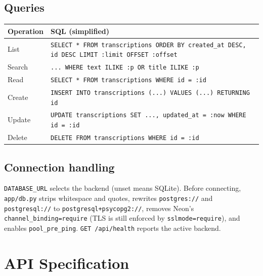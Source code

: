\documentclass[11pt,a4paper]{article}
\begin{document}
\subsection{Queries}
\begin{table}[H]
\centering
\begin{tabularx}{\linewidth}{@{}lX@{}}
\toprule
\textbf{Operation} & \textbf{SQL (simplified)}\\
\midrule
List & \texttt{SELECT * FROM transcriptions ORDER BY created\_at DESC, id DESC LIMIT :limit OFFSET :offset}\\
Search & \texttt{... WHERE text ILIKE :p OR title ILIKE :p}\\
Read & \texttt{SELECT * FROM transcriptions WHERE id = :id}\\
Create & \texttt{INSERT INTO transcriptions (...) VALUES (...) RETURNING id}\\
Update & \texttt{UPDATE transcriptions SET ..., updated\_at = :now WHERE id = :id}\\
Delete & \texttt{DELETE FROM transcriptions WHERE id = :id}\\
\bottomrule
\end{tabularx}
\end{table}

\subsection{Connection handling}
\texttt{DATABASE\_URL} selects the backend (unset means SQLite). Before connecting, \texttt{app/db.py}
strips whitespace and quotes, rewrites \texttt{postgres://} and \texttt{postgresql://} to
\texttt{postgresql+psycopg2://}, removes Neon's \texttt{channel\_binding=require}
(TLS is still enforced by \texttt{sslmode=require}), and enables \texttt{pool\_pre\_ping}.
\texttt{GET /api/health} reports the active backend.

\section{API Specification}
\end{document}
